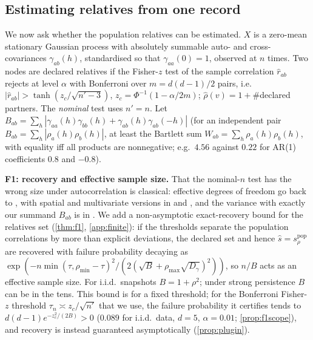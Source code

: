 \documentclass[pdflatex,sn-apa]{sn-jnl}
\theoremstyle{thmstyleone}
\theoremstyle{thmstylethree}
\theoremstyle{thmstyletwo}
\newcommand{\srho}{s_\rho}
\begin{document}
\subsection{Estimating relatives from one record}
\label{sec:finite}

We now ask whether the population relatives can be estimated. $X$ is a
zero-mean stationary Gaussian process with absolutely summable auto- and
cross-covariances $\gamma_{ab}(h)$, standardised so that $\gamma_{aa}(0)=1$,
observed at $n$ times. Two nodes are declared relatives if the Fisher-$z$ test
of the sample correlation $\hat r_{ab}$ rejects at level $\alpha$ with
Bonferroni over $m=d(d{-}1)/2$ pairs, i.e. $|\hat r_{ab}|>\tanh(z_c/\sqrt{n'-3})$,
$z_c=\Phi^{-1}(1-\alpha/2m)$; $\hat\rho(v)=1+\#$declared partners. The
\emph{nominal} test uses $n'=n$. Let
$B_{ab}=\sum_h|\gamma_{aa}(h)\gamma_{bb}(h)+\gamma_{ab}(h)\gamma_{ab}(-h)|$
(for an independent pair $B_{ab}=\sum_h|\rho_a(h)\rho_b(h)|$, at least the
Bartlett sum $W_{ab}=\sum_h\rho_a(h)\rho_b(h)$, with equality iff all products
are nonnegative; e.g.\ $4.56$ against $0.22$ for AR(1) coefficients $0.8$ and
$-0.8$).

\textbf{F1: recovery and effective sample size.} That the nominal-$n$ test has
the wrong size under autocorrelation is classical: effective degrees of
freedom go back to \citet{bartlett1935}, with spatial and multivariate versions
in \citet{clifford1989} and \citet{roy1989}, and the variance with exactly our
summand $B_{ab}$ is in \citet{afyouni2019effective}. We add a non-asymptotic
exact-recovery bound for the relatives set (\cref{thm:f1}, \cref{app:finite}):
if the thresholds separate the population correlations by more than explicit
deviations, the declared set and hence $\hat s=\srho^{\mathrm{pop}}$ are
recovered with failure probability decaying as
$\exp(-n\min(\tau,\rho_{\min}-\tau)^2/(2(\sqrt B+\rho_{\max}\sqrt{D_\gamma})^2))$,
so $n/B$ acts as an effective sample size. For i.i.d.\ snapshots $B=1+\rho^2$;
under strong persistence $B$ can be in the tens. This bound is for a fixed
threshold; for the Bonferroni Fisher-$z$ threshold $\tau_n\asymp z_c/\sqrt{n'}$
that we use, the failure probability it certifies tends to
$d(d{-}1)e^{-z_c^2/(2B)}>0$ ($0.089$ for i.i.d.\ data, $d=5$, $\alpha=0.01$;
\cref{prop:f1scope}), and recovery is instead guaranteed asymptotically
(\cref{prop:plugin}).
\end{document}
